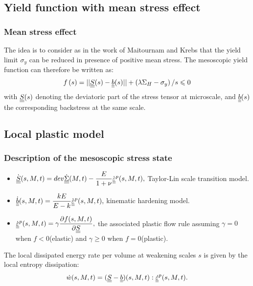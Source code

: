 \documentclass[xcolor=table]{Bredelebeamer}
\begin{document}
\subsection{Yield function with mean stress effect}

\begin{frame}
	\frametitle{Mean stress effect}	
The idea is to consider as in the work of Maitournam and Krebs that the yield limit $\sigma_y$ can be reduced in presence of positive mean stress. The mesoscopic yield function can therefore be written as:
\begin{equation}
f\left(s\right)=||\uline{\uline{S}}(s)-\uline{\uline{b}}(s)||+\left( \lambda \Sigma_H-\sigma_y\right) /s\leqslant 0
\label{yieldfun}
\end{equation}
with $\uline{\uline{S}}(s)$ denoting the deviatoric part of the stress tensor at microscale, and $\uline{\uline{b}}(s)$ the corresponding backstress at the same scale.
\end{frame}	

\subsection{Local plastic model}
\begin{frame}
	\frametitle{Description of the mesoscopic stress state}	

\begin{itemize}
	\item $\dot{\uline{\uline{S}}}(s,M,t)=dev\dot{\uline{\uline{\Sigma}}}(M,t)-\dfrac{E}{1+\nu}\dot{\uline{\uline{\varepsilon}}}^p(s,M,t),$ Taylor-Lin scale transition model.

	\vspace{6pt}	
	\item
	$\dot{\uline{\uline{b}}}(s,M,t)=\dfrac{kE}{E-k} \dot{\uline{\uline{\varepsilon}}}^p(s,M,t),$  kinematic hardening model.

	\vspace{6pt}	
		\item
		$\dot{\uline{\uline{\varepsilon}}}^p(s,M,t)=\gamma\dfrac{\partial f(s,M,t)}{\partial \uline{\uline{S}}}, $ the associated plastic flow rule assuming $\gamma=0$ when $f<0$(elastic) and  $\gamma\geqslant0$ when $f=0$(plastic).
\end{itemize}

	\vspace{6pt}
The local dissipated energy rate per volume at weakening scales $s$  is given by the local entropy dissipation:
$$\dot{w}(s,M,t)=(\uline{\uline{S}}-\uline{\uline{b}})(s,M,t):\uline{\uline{\dot{\varepsilon}}}^p(s,M,t).$$
\end{frame}
\end{document}
